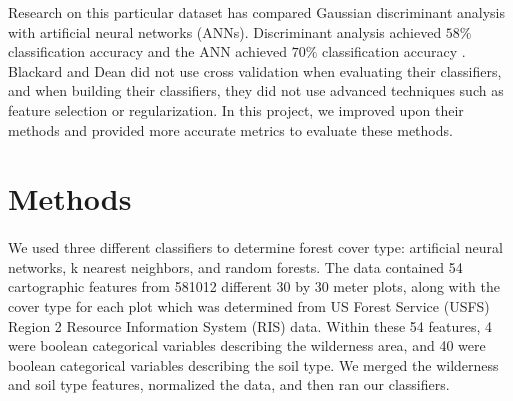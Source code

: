 \documentclass[12pt]{article}
\begin{document}
\par
Research on this particular dataset has compared Gaussian discriminant analysis with artificial neural networks (ANNs).  Discriminant analysis achieved $58\%$ classification accuracy and the ANN achieved $70\%$ classification accuracy \cite{blackard00}. Blackard and Dean did not use cross validation when evaluating their classifiers, and when building their classifiers, they did not use advanced techniques such as feature selection or regularization. In this project, we improved upon their methods and provided more accurate metrics to evaluate these methods.

\section{Methods}
\paragraph{}
We used three different classifiers to determine forest cover type: artificial neural networks, k nearest neighbors, and random forests. The data contained 54 cartographic features from 581012 different 30 by 30 meter plots, along with the cover type for each plot which was determined from US Forest Service (USFS) Region 2 Resource Information System (RIS) data. Within these 54 features, 4 were boolean categorical variables describing the wilderness area, and 40 were boolean categorical variables describing the soil type. We merged the wilderness and soil type features, normalized the data, and then ran our classifiers.
\\
\end{document}

